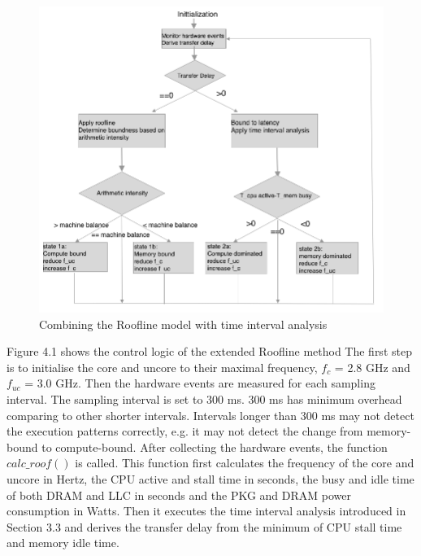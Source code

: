 \begin{figure} [h] %
	\centering   %
	\includegraphics[width=12cm]{pictures/TIA}
	\caption{Combining the Roofline model with time interval analysis}
\end{figure}


Figure 4.1 shows the control logic of the extended Roofline method The first step is to initialise the core and uncore to their maximal frequency, $f_{c} $ = 2.8 GHz and $f_{uc} $ = 3.0 GHz. Then the hardware events are measured for each sampling interval. The sampling interval is set to 300 ms. 300 ms has minimum overhead comparing to other shorter intervals. Intervals longer than 300 ms may not detect the execution patterns correctly, e.g. it may not detect the change from memory-bound to compute-bound.
After collecting the hardware events, the function $calc\_roof()$ is called. This function first calculates the frequency of the core and uncore in Hertz, the CPU active and stall time in seconds, the busy and idle time of both DRAM and LLC in seconds and the PKG and DRAM power consumption in Watts. Then it executes the time interval analysis introduced in Section 3.3 and derives the transfer delay from the minimum of CPU stall time and memory idle time. 

